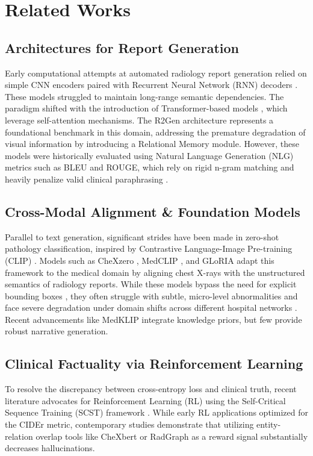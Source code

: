 \documentclass[10pt,a4paper,twocolumn]{article}
\begin{document}
\section{Related Works}
\label{sec:related}

\subsection{Architectures for Report Generation}
Early computational attempts at automated radiology report generation relied on simple CNN encoders paired with Recurrent Neural Network (RNN) decoders \cite{boag2020baselines}. These models struggled to maintain long-range semantic dependencies. The paradigm shifted with the introduction of Transformer-based models \cite{vaswani2017attention}, which leverage self-attention mechanisms. The R2Gen architecture \cite{chen2020r2gen} represents a foundational benchmark in this domain, addressing the premature degradation of visual information by introducing a Relational Memory module. However, these models were historically evaluated using Natural Language Generation (NLG) metrics such as BLEU and ROUGE, which rely on rigid n-gram matching and heavily penalize valid clinical paraphrasing \cite{miura2021improving}.

\subsection{Cross-Modal Alignment \& Foundation Models}
Parallel to text generation, significant strides have been made in zero-shot pathology classification, inspired by Contrastive Language-Image Pre-training (CLIP) \cite{radford2021learning}. Models such as CheXzero \cite{tiu2022chexzero}, MedCLIP \cite{wang2022medclip}, and GLoRIA \cite{huang2023gloria} adapt this framework to the medical domain by aligning chest X-rays with the unstructured semantics of radiology reports. While these models bypass the need for explicit bounding boxes \cite{liu2021contrastive}, they often struggle with subtle, micro-level abnormalities and face severe degradation under domain shifts across different hospital networks \cite{endo2021retrieval}. Recent advancements like MedKLIP \cite{wu2023medklip} integrate knowledge priors, but few provide robust narrative generation.

\subsection{Clinical Factuality via Reinforcement Learning}
To resolve the discrepancy between cross-entropy loss and clinical truth, recent literature advocates for Reinforcement Learning (RL) using the Self-Critical Sequence Training (SCST) framework \cite{rennie2017self}. While early RL applications optimized for the CIDEr metric, contemporary studies demonstrate that utilizing entity-relation overlap tools like CheXbert \cite{smit2020chexbert} or RadGraph \cite{jain2023radgraph} as a reward signal substantially decreases hallucinations.
\end{document}
